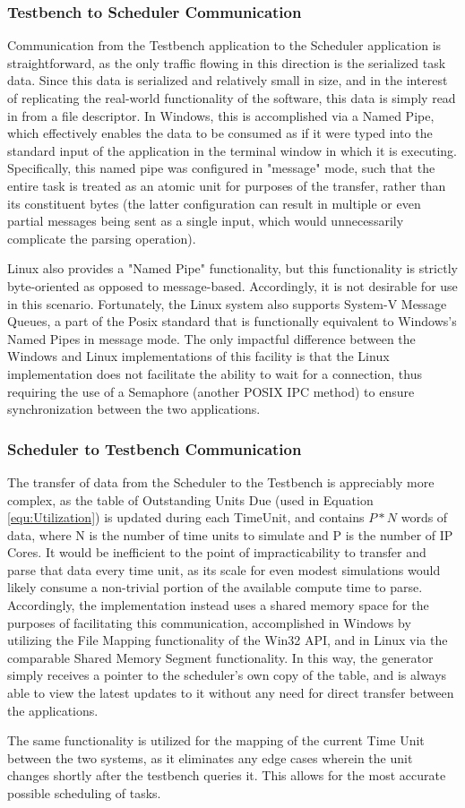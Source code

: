 \subsubsection{Testbench to Scheduler Communication}\label{subsubsec:TestbenchSchedIPC}
Communication from the Testbench application to the Scheduler application is straightforward, as the only traffic flowing in this direction is the serialized task data. Since this data is serialized and relatively small in size, and in the interest of replicating the real-world functionality of the software, this data is simply read in from a file descriptor. In Windows, this is accomplished via a Named Pipe, which effectively enables the data to be consumed as if it were typed into the standard input of the application in the terminal window in which it is executing. Specifically, this named pipe was configured in "message" mode, such that the entire task is treated as an atomic unit for purposes of the transfer, rather than its constituent bytes (the latter configuration can result in multiple or even partial messages being sent as a single input, which would unnecessarily complicate the parsing operation).

Linux also provides a "Named Pipe" functionality, but this functionality is strictly byte-oriented as opposed to message-based. Accordingly, it is not desirable for use in this scenario. Fortunately, the Linux system also supports System-V Message Queues, a part of the Posix standard that is functionally equivalent to Windows's Named Pipes in message mode. The only impactful difference between the Windows and Linux implementations of this facility is that the Linux implementation does not facilitate the ability to wait for a connection, thus requiring the use of a Semaphore (another POSIX IPC method) to ensure synchronization between the two applications.

\subsubsection{Scheduler to Testbench Communication}\label{subsubsec:SchedTestbenchIPC}
The transfer of data from the Scheduler to the Testbench is appreciably more complex, as the table of Outstanding Units Due (used in Equation \ref{equ:Utilization}) is updated during each TimeUnit, and contains $P*N$ words of data, where N is the number of time units to simulate and P is the number of IP Cores. It would be inefficient to the point of impracticability to transfer and parse that data every time unit, as its scale for even modest simulations would likely consume a non-trivial portion of the available compute time to parse. Accordingly, the implementation instead uses a shared memory space for the purposes of facilitating this communication, accomplished in Windows by utilizing the File Mapping functionality of the Win32 API, and in Linux via the comparable Shared Memory Segment functionality. In this way, the generator simply receives a pointer to the scheduler's own copy of the table, and is always able to view the latest updates to it without any need for direct transfer between the applications.

The same functionality is utilized for the mapping of the current Time Unit between the two systems, as it eliminates any edge cases wherein the unit changes shortly after the testbench queries it. This allows for the most accurate possible scheduling of tasks.